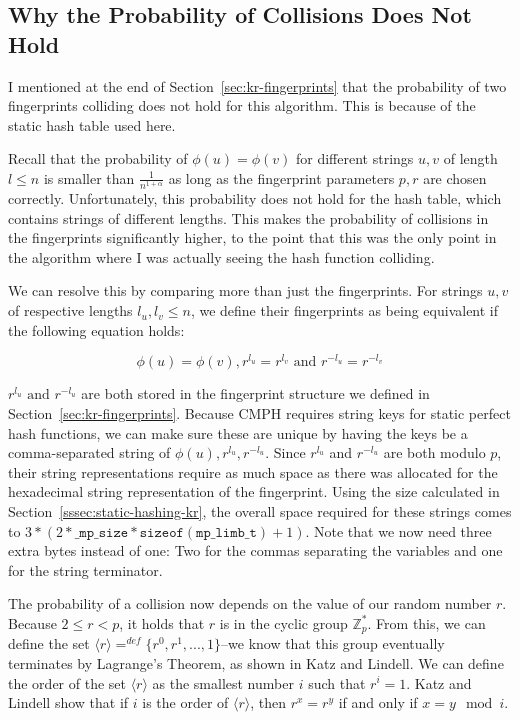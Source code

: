\documentclass[ %
                    author={Dominic Joseph Moylett},
                    degree={MEng},
                     title={Dictionary Matching with Fingerprints},
                  subtitle={An Empirical Analysis},
                      type={Research},
                      year={2014} ]{dissertation}
\begin{document}
\subsection{Why the Probability of Collisions Does Not Hold}
\label{ssec:short-collisions}

I mentioned at the end of Section~\ref{sec:kr-fingerprints} that the probability of two fingerprints colliding does not hold for this algorithm. This is because of the static hash table used here.

Recall that the probability of $\phi(u) = \phi(v)$ for different strings $u, v$ of length $l \leq n$ is smaller than $\frac{1}{n^{1 + \alpha}}$ as long as the fingerprint parameters $p, r$ are chosen correctly. Unfortunately, this probability does not hold for the hash table, which contains strings of different lengths. This makes the probability of collisions in the fingerprints significantly higher, to the point that this was the only point in the algorithm where I was actually seeing the hash function colliding.

We can resolve this by comparing more than just the fingerprints. For strings $u, v$ of respective lengths $l_u, l_v \leq n$, we define their fingerprints as being equivalent if the following equation holds:

$$\phi(u) = \phi(v), r^{l_u} = r^{l_v} \text{ and } r^{-l_u} = r^{-l_v}$$

$r^{l_u} \text{ and } r^{-l_u}$ are both stored in the fingerprint structure we defined in Section~\ref{sec:kr-fingerprints}. Because CMPH requires string keys for static perfect hash functions, we can make sure these are unique by having the keys be a comma-separated string of $\phi(u),r^{l_u},r^{-l_u}$. Since $r^{l_u}$ and $r^{-l_u}$ are both modulo $p$, their string representations require as much space as there was allocated for the hexadecimal string representation of the fingerprint. Using the size calculated in Section~\ref{sssec:static-hashing-kr}, the overall space required for these strings comes to $3 * (2 * \texttt{\_mp\_size} * \texttt{sizeof}(\texttt{mp\_limb\_t}) + 1)$. Note that we now need three extra bytes instead of one: Two for the commas separating the variables and one for the string terminator.

The probability of a collision now depends on the value of our random number $r$. Because $2 \leq r < p$, it holds that $r$ is in the cyclic group $\mathbb{Z}^*_p$. From this, we can define the set $\langle r \rangle =^{def} \{r^0, r^1,...,1\}$--we know that this group eventually terminates by Lagrange's Theorem, as shown in Katz and Lindell\cite{katz:lagrange}. We can define the order of the set $\langle r \rangle$ as the smallest number $i$ such that $r^i = 1$. Katz and Lindell\cite{katz:cyclic-groups} show that if $i$ is the order of $\langle r \rangle$, then $r^x = r^y$ if and only if $x = y \mod i$.
\end{document}
